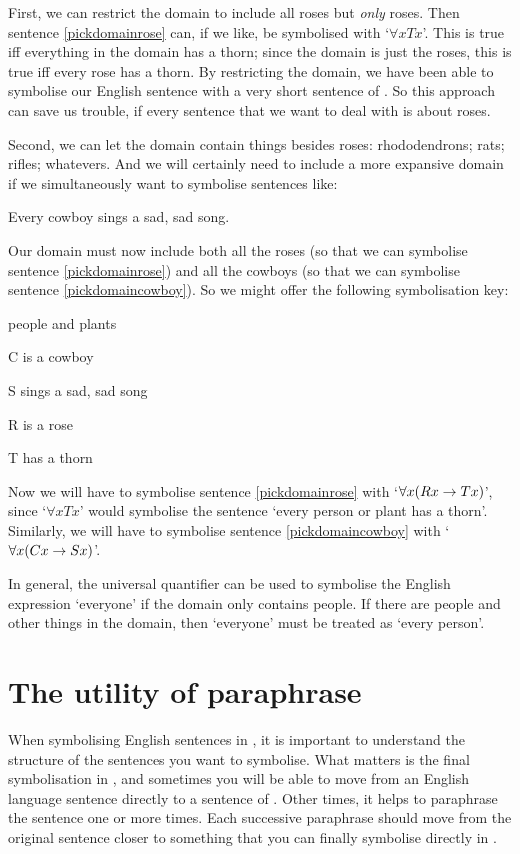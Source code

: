 First, we can restrict the domain to include all roses but \emph{only} roses. Then sentence \ref{pickdomainrose} can, if we like, be symbolised with `$\forall x Tx$'. This is true iff everything in the domain has a thorn; since the domain is just the roses, this is true iff every rose has a thorn. By restricting the domain, we have been able to symbolise our English sentence with a very short sentence of \FOL. So this approach can save us trouble, if every sentence that we want to deal with is about roses.

Second, we can let the domain contain things besides roses: rhododendrons; rats; rifles; whatevers.  And we will certainly need to include a more expansive domain if we simultaneously want to symbolise sentences like:
	\begin{earg}
		\item[\ex{pickdomaincowboy}] Every cowboy sings a sad, sad song.
	\end{earg}
Our domain must now include both all the roses (so that we can symbolise sentence \ref{pickdomainrose}) and all the cowboys (so that we can symbolise sentence \ref{pickdomaincowboy}). So we might offer the following symbolisation key:\label{poison}
	\begin{ekey}
		\item[\text{domain}] people and plants
		\item[C]  is a cowboy
		\item[S]  sings a sad, sad song
		\item[R]  is a rose
		\item[T]  has a thorn
	\end{ekey}
Now we will have to symbolise sentence \ref{pickdomainrose} with `$\forall x (Rx \rightarrow Tx)$', since `$\forall x Tx$' would symbolise the sentence `every person or plant has a thorn'. Similarly, we will have to symbolise sentence \ref{pickdomaincowboy} with `$\forall x (Cx \rightarrow Sx)$'. 

In general, the universal quantifier can be used to symbolise the English expression `everyone' if the domain only contains people. If there are people and other things in the domain, then `everyone' must be treated as `every person'.


\section{The utility of paraphrase}
When symbolising English sentences in \FOL, it is important to understand the structure of the sentences you want to symbolise. What matters is the final symbolisation in \FOL, and sometimes you will be able to move from an English language sentence directly to a sentence of \FOL. Other times, it helps to paraphrase the sentence one or more times. Each successive paraphrase should move from the original sentence closer to something that you can finally symbolise directly in \FOL.

